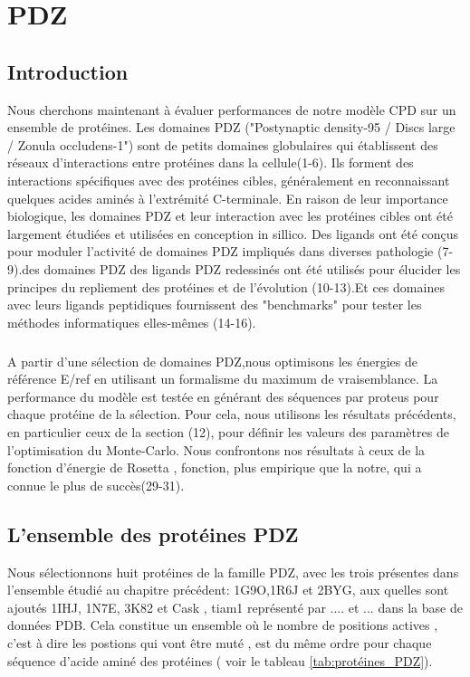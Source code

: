 
\chapter{PDZ}
\label{chap:PDZ}


\section{Introduction}

Nous cherchons maintenant à évaluer performances de notre modèle CPD sur un ensemble de protéines. Les domaines PDZ ("Postynaptic density-95 / Discs large / Zonula occludens-1") sont de petits domaines globulaires qui établissent  des réseaux d'interactions entre protéines dans la cellule(1-6).   Ils forment des interactions spécifiques avec des protéines cibles, généralement en reconnaissant quelques acides aminés à l'extrémité C-terminale. En raison de leur importance biologique, les domaines PDZ et leur interaction avec les protéines cibles ont été largement étudiées et utilisées en conception in sillico. Des ligands ont été conçus  pour moduler l'activité de domaines PDZ impliqués dans diverses pathologie (7-9).des domaines  PDZ des ligands PDZ redessinés ont été utilisés pour élucider les principes du repliement des protéines et de l'évolution (10-13).Et ces domaines avec leurs ligands peptidiques fournissent des "benchmarks" pour tester les méthodes informatiques elles-mêmes (14-16).
\paragraph{}
A partir d'une sélection de domaines PDZ,nous optimisons les énergies de référence E/ref  en utilisant un formalisme du maximum de vraisemblance. La performance du modèle est testée en générant des séquences par proteus pour chaque protéine de la sélection. Pour cela, nous utilisons les résultats précédents, en particulier ceux de la section (12), pour définir les valeurs des paramètres de l'optimisation du Monte-Carlo. Nous confrontons nos résultats à ceux de la fonction d'énergie de Rosetta , fonction, plus empirique que la notre, qui a connue le plus de succès(29-31).    


\section{L'ensemble des protéines PDZ}
Nous sélectionnons huit protéines de la famille PDZ, avec les trois présentes dans l'ensemble étudié au chapitre précédent: 1G9O,1R6J et 2BYG, aux quelles sont ajoutés 1IHJ, 1N7E, 3K82 et Cask , tiam1 représenté par .... et ... dans la base de données PDB. Cela constitue un ensemble où le nombre de positions actives , c'est à dire les postions qui vont être muté , est du même ordre pour chaque séquence d'acide aminé des protéines ( voir le tableau \ref{tab:protéines_PDZ}).



